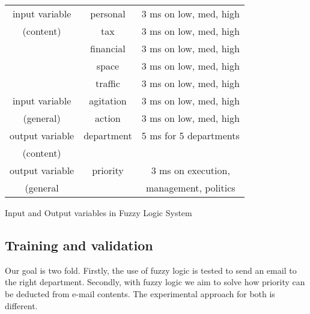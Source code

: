 \documentclass[journal]{IEEEtran}
\begin{document}
\begin{center}
\begin{tabular}{ |c|c|c| } 
 \hline
 input variable     & personal  & 3 ms on low, med, high    \\ 
 (content)          & tax       & 3 ms on low, med, high    \\ 
                    & financial & 3 ms on low, med, high    \\ 
                    & space     & 3 ms on low, med, high    \\
                    & traffic   & 3 ms on low, med, high    \\ 
 input variable     & agitation & 3 ms on low, med, high    \\
 (general)          & action    & 3 ms on low, med, high    \\
 output variable    & department & 5 ms for 5 departments   \\
 (content)          &           &                           \\  
 output variable    & priority  & 3 ms on execution,        \\    
 (general           &           & management, politics      \\
 
\hline
\end{tabular}
\caption{Input and Output variables in Fuzzy Logic System}
\label{table:1}
\end{center}

\subsection{Training and validation}

Our goal is two fold. Firstly, the use of fuzzy logic is tested to send an email to the right department. Secondly, with fuzzy logic we aim to solve how priority can be deducted from e-mail contents. The experimental approach for both is different. 
\end{document}
